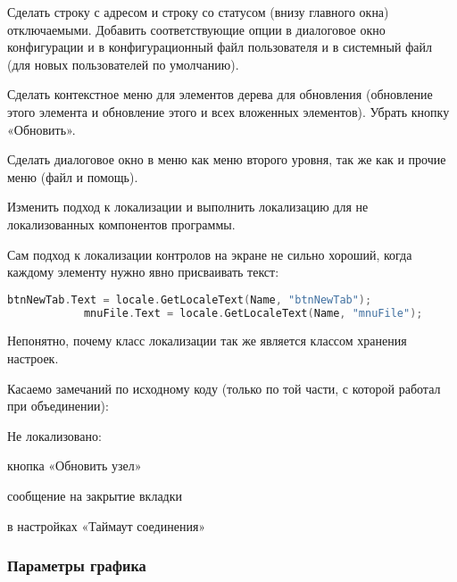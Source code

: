 \documentclass[10pt,a4paper]{article}
\begin{document}
Сделать строку с адресом и строку со статусом (внизу главного окна)
отключаемыми. Добавить соответствующие опции в диалоговое окно конфигурации и в
конфигурационный файл пользователя и в системный файл (для новых пользователей
по умолчанию).

Сделать контекстное меню для элементов дерева для обновления (обновление этого
элемента и обновление этого и всех вложенных элементов). Убрать кнопку
«Обновить».

Сделать диалоговое окно в меню как меню второго уровня, так же как и прочие меню
(файл и помощь).

Изменить подход к локализации и выполнить локализацию для не локализованных
компонентов программы.

\begin{description}

	\item Сам подход к локализации контролов на экране не сильно хороший, когда
	каждому элементу нужно явно присваивать текст:

		\begin{lstlisting}[language=C,label=GetLocaleText.cs,caption=GetLocaleText.cs]
			btnNewTab.Text = locale.GetLocaleText(Name, "btnNewTab");
			mnuFile.Text = locale.GetLocaleText(Name, "mnuFile");
		\end{lstlisting}

	\item Непонятно, почему класс локализации так же является классом хранения
	настроек.

	\item Касаемо замечаний по исходному коду (только по той части, с которой
	работал при объединении):

	\item Не локализовано:

		\begin{description}

			\item кнопка «Обновить узел»

			\item сообщение на закрытие вкладки

			\item в настройках «Таймаут соединения»

		\end{description}
\end{description}

\subsubsection{Параметры графика}
\end{document}
